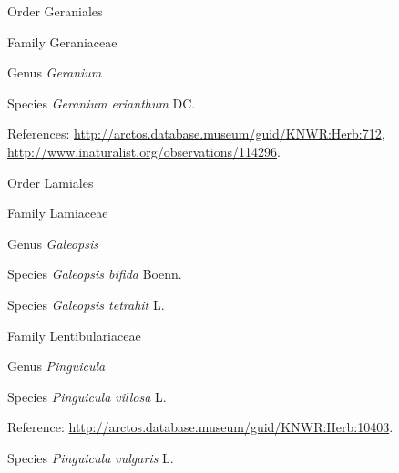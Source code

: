 \documentclass[9pt, article]{memoir}
\begin{document}
\begin{multicols}{2}
\vspace{6pt}\noindent\hspace{18pt}Order Geraniales


\vspace{6pt}\noindent\hspace{24pt}Family Geraniaceae


\vspace{6pt}\noindent\hspace{30pt}Genus \textit{Geranium}


\vspace{6pt}\noindent\hspace{36pt}Species \textit{Geranium erianthum} DC.


\vspace{6pt}References: 
\url{http://arctos.database.museum/guid/KNWR:Herb:712}, 
\url{http://www.inaturalist.org/observations/114296}.

\vspace{6pt}\noindent\hspace{18pt}Order Lamiales


\vspace{6pt}\noindent\hspace{24pt}Family Lamiaceae


\vspace{6pt}\noindent\hspace{30pt}Genus \textit{Galeopsis}


\vspace{6pt}\noindent\hspace{36pt}Species \textit{Galeopsis bifida} Boenn.


\vspace{6pt}\noindent\hspace{36pt}Species \textit{Galeopsis tetrahit} L.


\vspace{6pt}\noindent\hspace{24pt}Family Lentibulariaceae


\vspace{6pt}\noindent\hspace{30pt}Genus \textit{Pinguicula}


\vspace{6pt}\noindent\hspace{36pt}Species \textit{Pinguicula villosa} L.


\vspace{6pt}Reference: 
\url{http://arctos.database.museum/guid/KNWR:Herb:10403}.

\vspace{6pt}\noindent\hspace{36pt}Species \textit{Pinguicula vulgaris} L.



\end{multicols}
\end{document}
